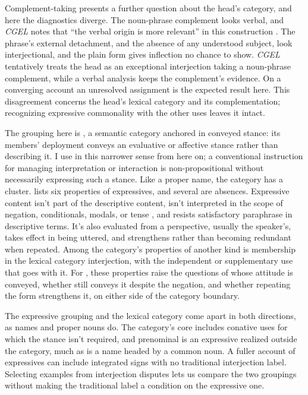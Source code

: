 \documentclass[12pt]{article}
\begin{document}
Complement-taking  presents a further
question about the head's category, and here the diagnostics diverge. The
noun-phrase complement looks verbal, and \textit{CGEL} notes that
\enquote{the verbal origin is more relevant} in this construction
\citep[1361 n.~70]{HuddlestonPullum2002}. The
phrase's external detachment, and the absence of any understood subject,
look interjectional, and the plain form gives inflection no chance to show.
\textit{CGEL} tentatively treats the head as an exceptional interjection
taking a noun-phrase complement, while a verbal analysis keeps the complement's evidence. On a converging
account an unresolved assignment is the expected result here. This disagreement concerns the head's lexical
category and its complementation; recognizing expressive commonality with
the other  uses leaves it intact.

The grouping here is , a semantic category
anchored in conveyed stance: its members' deployment conveys an evaluative
or affective stance rather than describing it. I use  in
this narrower sense from here on; a conventional instruction for managing
interpretation or interaction is non-propositional without necessarily
expressing such a stance. Like a proper name, the category has a
cluster. \textcite[166--167]{potts2007} lists six properties of
expressives, and several are absences. Expressive content isn't part of the
descriptive content, isn't interpreted in the scope of negation,
conditionals, modals, or tense \citep[170--171]{potts2007}, and resists
satisfactory paraphrase in descriptive terms. It's also evaluated from a
perspective, usually the speaker's, takes effect in being uttered, and
strengthens rather than becoming redundant when repeated. Among the category's
properties of another kind is membership in the lexical category
interjection, with the independent or supplementary use that goes with it. For , these
properties raise the questions of whose attitude is conveyed, whether
 still conveys it despite the negation,
and whether repeating the form strengthens it, on either side of the
category boundary.

The expressive grouping and the lexical category come apart in both
directions, as names and proper nouns do. The category's core includes
conative uses for which the stance isn't required, and prenominal
 is an expressive realized outside the category, much as
 is a name headed by a common noun. A fuller account of expressives can include integrated signs
with no traditional interjection label. Selecting examples from interjection
disputes lets us compare the two groupings without making the traditional
label a condition on the expressive one.
\end{document}
